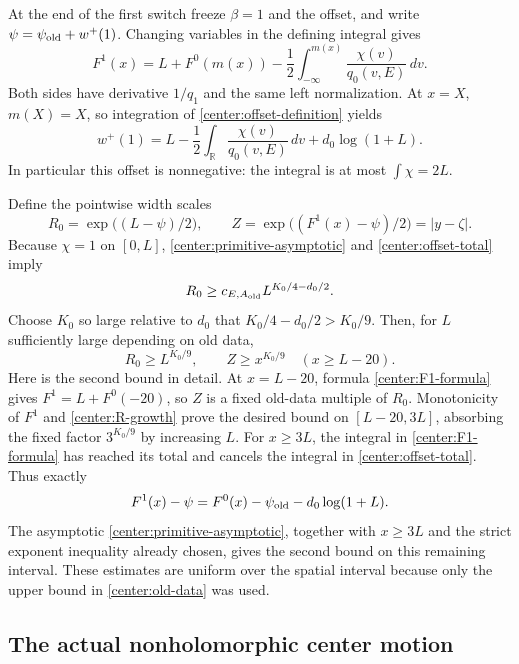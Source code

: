 At the end of the first switch freeze $\beta=1$ and the offset, and write
$\psi=\psi_{\rm old}+w^+(1)$. Changing variables in the defining integral gives
\begin{equation}\label{center:F1-formula}
 F^1(x)=L+F^0(m(x))
          -\frac12\int_{-\infty}^{m(x)}\frac{\chi(v)}{q_0(v,E)}\,dv.
\end{equation}
Both sides have derivative $1/q_1$ and the same left normalization. At $x=X$, $m(X)=X$, so integration of \eqref{center:offset-definition} yields
\begin{equation}\label{center:offset-total}
 w^+(1)=L-\frac12\int_{\mathbb R}\frac{\chi(v)}{q_0(v,E)}\,dv
                  +d_0\log(1+L).
\end{equation}
In particular this offset is nonnegative: the integral is at most $\int\chi=2L$.

Define the pointwise width scales
\[
 R_0=\exp\bigl((L-\psi)/2\bigr),\qquad
 Z=\exp\bigl((F^1(x)-\psi)/2\bigr)=|y-\zeta|.
\]
Because $\chi=1$ on $[0,L]$, \eqref{center:primitive-asymptotic} and \eqref{center:offset-total} imply
\begin{equation}\label{center:R-growth}
 R_0\ge c_{E,A_{\rm old}}L^{K_0/4-d_0/2}.
\end{equation}
Choose $K_0$ so large relative to $d_0$ that $K_0/4-d_0/2>K_0/9$. Then, for $L$ sufficiently large depending on old data,
\begin{equation}\label{center:width-bounds}
 R_0\ge L^{K_0/9},\qquad
 Z\ge x^{K_0/9}\quad(x\ge L-20).
\end{equation}
Here is the second bound in detail. At $x=L-20$, formula \eqref{center:F1-formula} gives $F^1=L+F^0(-20)$, so $Z$ is a fixed old-data multiple of $R_0$. Monotonicity of $F^1$ and \eqref{center:R-growth} prove the desired bound on $[L-20,3L]$, absorbing the fixed factor $3^{K_0/9}$ by increasing $L$. For $x\ge3L$, the integral in \eqref{center:F1-formula} has reached its total and cancels the integral in \eqref{center:offset-total}. Thus exactly
\[
 F^1(x)-\psi=F^0(x)-\psi_{\rm old}-d_0\log(1+L).
\]
The asymptotic \eqref{center:primitive-asymptotic}, together with $x\ge3L$ and the strict exponent inequality already chosen, gives the second bound on this remaining interval. These estimates are uniform over the spatial interval because only the upper bound in \eqref{center:old-data} was used.

\subsection{The actual nonholomorphic center motion}

